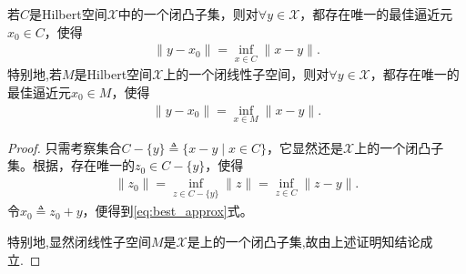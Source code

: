 \documentclass[../../main.tex]{subfiles}%
\begin{document}
\begin{corollary}[最佳逼近元的存在唯一性]\label{corollary:泛函分析--最佳逼近元的存在唯一性}
若$C$是Hilbert空间$\mathscr{X}$中的一个闭凸子集，则对$\forall y \in \mathscr{X}$，都存在唯一的最佳逼近元$x_0 \in C$，使得
\begin{align}
\|y - x_0\| = \inf\limits_{x \in C} \|x - y\|. \label{eq:best_approx}
\end{align}
特别地,若$M$是Hilbert空间$\mathscr{X}$上的一个闭线性子空间，则对$\forall y \in \mathscr{X}$，都存在唯一的最佳逼近元$ x_0 \in M$，使得
\begin{align*}
\|y - x_0\| = \inf\limits_{x \in M} \|x - y\|.
\end{align*}
\end{corollary}
\begin{proof}
只需考察集合$C - \{y\} \triangleq \{x - y \mid x \in C\}$，它显然还是$\mathscr{X}$上的一个闭凸子集。根据，存在唯一的$ z_0 \in C - \{y\}$，使得
\begin{align*}
\parallel z_0\parallel =\mathop {\mathrm{inf}} \limits_{z\in C-\{y\}}\parallel z\parallel =\mathop {\mathrm{inf}} \limits_{z\in C}\parallel z-y\parallel .
\end{align*}
令$x_0 \triangleq z_0 + y$，便得到\eqref{eq:best_approx}式。

特别地,显然闭线性子空间$M$是$\mathscr{X}$是上的一个闭凸子集,故由上述证明知结论成立.
\end{proof}
\end{document}
